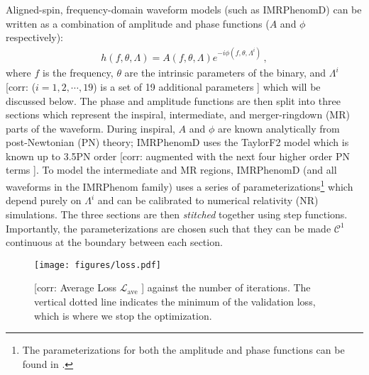 \documentclass[twocolumn]{aastex631}
\newcommand{\corr}[1]{{\color{red}[corr: #1 ]}}
\begin{document}
Aligned-spin, frequency-domain waveform models (such as IMRPhenomD) can be written as a
combination of amplitude and phase functions ($A$ and $\phi$ respectively):
\begin{align}\label{eq:}
	h(f,\theta,\Lambda) = A(f,\theta,\Lambda)e^{-i\phi(f,\theta,\Lambda^i)}\,,
\end{align}
where $f$ is the frequency, $\theta$ are the intrinsic parameters of the binary, and $\Lambda^i$ \corr{($i=1,2,\cdots,19$) is a set of 19 additional
parameters} which will be discussed below. 
The phase and amplitude functions are then split into three sections which represent the
inspiral, intermediate, and merger-ringdown (MR) parts of the waveform. 
During inspiral, $A$ and $\phi$ are known analytically from post-Newtonian (PN) theory;
IMRPhenomD uses the TaylorF2 model \citep{Buonanno:2009zt, Arun:2004hn} which is known up 
to 3.5PN order \corr{augmented with the next four higher order PN terms}.
To model the intermediate and MR regions, IMRPhenomD (and all waveforms in the IMRPhenom family)
uses a series of parameterizations\footnote{
	The parameterizations for both the amplitude and phase functions can be found in \citep{khan2016frequency}.
} 
which depend purely on $\Lambda^i$ and can be calibrated to numerical relativity (NR) simulations.
The three sections are then \textit{stitched} together using step functions.
Importantly, the parameterizations are chosen such that they can be made $\mathcal{C}^1$ continuous at the
boundary between each section.

\begin{figure}
	\centering
	\texttt{[image: figures/loss.pdf]}
	\caption{\corr{Average Loss $\mathcal{L}_{\mathrm{ave}}$} against the number of iterations. The vertical
	dotted line indicates the minimum of the validation loss, which is where we stop
	the optimization.}
	\label{fig:loss}
\end{figure}
\end{document}
